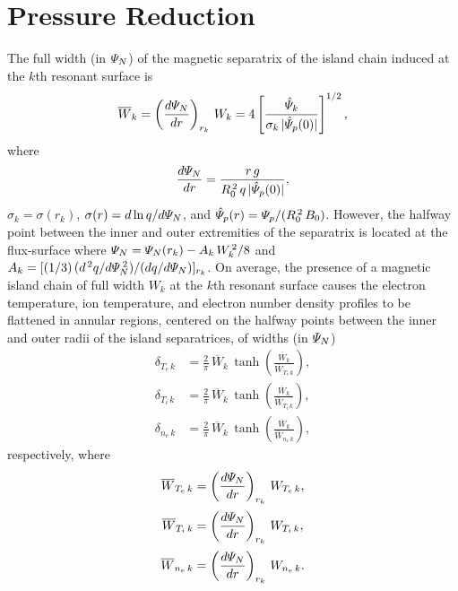 \documentclass[notitlepage,12pt]{article}
\begin{document}
\section{Pressure Reduction} \label{a5}
The full width (in ${\mit\Psi}_N$)  of the magnetic separatrix of the island chain induced at the $k$th resonant surface is
\begin{equation}
\overline{W}_k = \left(\frac{d{\mit\Psi}_N}{dr}\right)_{r_k}\,W_k=4\left[\frac{\hat{\mit\Psi}_k}{\sigma_k\,|\hat{{\mit\Psi}}_p(0)|}\right]^{1/2},
\end{equation}
where 
\begin{equation}
\frac{d{\mit\Psi}_N}{dr} = \frac{r\,g}{R_0^{\,2}\,q\,|\hat{\mit\Psi}_p(0)|},
\end{equation}
$\sigma_k=\sigma(r_k)$, $\sigma(r) = d\ln q/d{\mit\Psi}_N$, and $\hat{\mit\Psi}_p(r) = {\mit\Psi}_p/(R_0^{\,2}\,B_0)$.  
However, the halfway point between the inner and outer extremities of the separatrix is located at the flux-surface where ${\mit\Psi}_N = {\mit\Psi}_N(r_k) - A_k\,W_k^{\,2}/8$ and $A_k = [(1/3)\,(d^{\,2}q/d{\mit\Psi}_N^{\,2})/(dq/d{\mit\Psi}_N)]_{r_k}$.
On average, the presence of a magnetic island chain of full width $W_k$ at the $k$th resonant surface
causes the electron temperature, ion temperature,  and electron number density profiles to be flattened in  annular regions, centered on the
halfway points between the inner and outer radii of the island separatrices, of widths (in ${\mit\Psi}_N$)
\begin{align}
\delta_{T_e\,k}& = \frac{2}{\pi}\,\overline{W}_k\,\tanh\left(\frac{\overline{W}_k}{\overline{W}_{T_e\,k}}\right),\\[0.5ex]
\delta_{T_i\,k}& = \frac{2}{\pi}\,\overline{W}_k\,\tanh\left(\frac{\overline{W}_k}{\overline{W}_{T_i\,k}}\right),\\[0.5ex]
\delta_{n_e\,k}& = \frac{2}{\pi}\,\overline{W}_k\,\tanh\left(\frac{\overline{W}_k}{\overline{W}_{n_e\,k}}\right),
\end{align}
respectively, where
\begin{align}
\overline{W}_{T_e\,k} &=  \left(\frac{d{\mit\Psi}_N}{dr}\right)_{r_k}\,W_{T_e\,k},\\[0.5ex]
\overline{W}_{T_i\,k} &= \left(\frac{d{\mit\Psi}_N}{dr}\right)_{r_k}\,W_{T_i\,k},\\[0.5ex]
\overline{W}_{n_e\,k} &= \left(\frac{d{\mit\Psi}_N}{dr}\right)_{r_k}\,W_{n_e\,k}.
\end{align}
\end{document}
